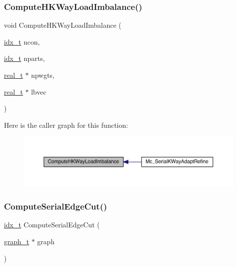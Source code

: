 \subsubsection{\texorpdfstring{Compute\+H\+K\+Way\+Load\+Imbalance()}{ComputeHKWayLoadImbalance()}}
{\footnotesize\ttfamily void Compute\+H\+K\+Way\+Load\+Imbalance (\begin{DoxyParamCaption}\item[{\hyperlink{a00876_aaa5262be3e700770163401acb0150f52}{idx\+\_\+t}}]{ncon,  }\item[{\hyperlink{a00876_aaa5262be3e700770163401acb0150f52}{idx\+\_\+t}}]{nparts,  }\item[{\hyperlink{a00876_a1924a4f6907cc3833213aba1f07fcbe9}{real\+\_\+t} $\ast$}]{npwgts,  }\item[{\hyperlink{a00876_a1924a4f6907cc3833213aba1f07fcbe9}{real\+\_\+t} $\ast$}]{lbvec }\end{DoxyParamCaption})}

Here is the caller graph for this function\+:\nopagebreak
\begin{figure}[H]
\begin{center}
\leavevmode
\includegraphics[width=350pt]{a00407_aac7dc6996b9a0fa1725d5fb832c83f6d_icgraph}
\end{center}
\end{figure}
\mbox{\label{a00407_ad7e392702b960962be6a33019588c455}} 
\subsubsection{\texorpdfstring{Compute\+Serial\+Edge\+Cut()}{ComputeSerialEdgeCut()}}
{\footnotesize\ttfamily \hyperlink{a00876_aaa5262be3e700770163401acb0150f52}{idx\+\_\+t} Compute\+Serial\+Edge\+Cut (\begin{DoxyParamCaption}\item[{\hyperlink{a00734}{graph\+\_\+t} $\ast$}]{graph }\end{DoxyParamCaption})}

